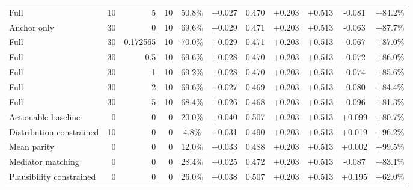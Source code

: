 \begin{table}[htbp]
\begin{tabular}{lrrrccccccc}
Full & 10 & 5 & 10 & 50.8\% & +0.027 & 0.470 & +0.203 & +0.513 & -0.081 & +84.2\% \\
Anchor only & 30 & 0 & 10 & 69.6\% & +0.029 & 0.471 & +0.203 & +0.513 & -0.063 & +87.7\% \\
Full & 30 & 0.172565 & 10 & 70.0\% & +0.029 & 0.471 & +0.203 & +0.513 & -0.067 & +87.0\% \\
Full & 30 & 0.5 & 10 & 69.6\% & +0.028 & 0.470 & +0.203 & +0.513 & -0.072 & +86.0\% \\
Full & 30 & 1 & 10 & 69.2\% & +0.028 & 0.470 & +0.203 & +0.513 & -0.074 & +85.6\% \\
Full & 30 & 2 & 10 & 69.6\% & +0.027 & 0.469 & +0.203 & +0.513 & -0.080 & +84.4\% \\
Full & 30 & 5 & 10 & 68.4\% & +0.026 & 0.468 & +0.203 & +0.513 & -0.096 & +81.3\% \\
Actionable baseline & 0 & 0 & 0 & 20.0\% & +0.040 & 0.507 & +0.203 & +0.513 & +0.099 & +80.7\% \\
Distribution constrained & 10 & 0 & 0 & 4.8\% & +0.031 & 0.490 & +0.203 & +0.513 & +0.019 & +96.2\% \\
Mean parity & 0 & 0 & 0 & 12.0\% & +0.033 & 0.488 & +0.203 & +0.513 & +0.002 & +99.5\% \\
Mediator matching & 0 & 0 & 0 & 28.4\% & +0.025 & 0.472 & +0.203 & +0.513 & -0.087 & +83.1\% \\
Plausibility constrained & 0 & 0 & 0 & 26.0\% & +0.038 & 0.507 & +0.203 & +0.513 & +0.195 & +62.0\% \\
\bottomrule
\end{tabular}
\end{table}